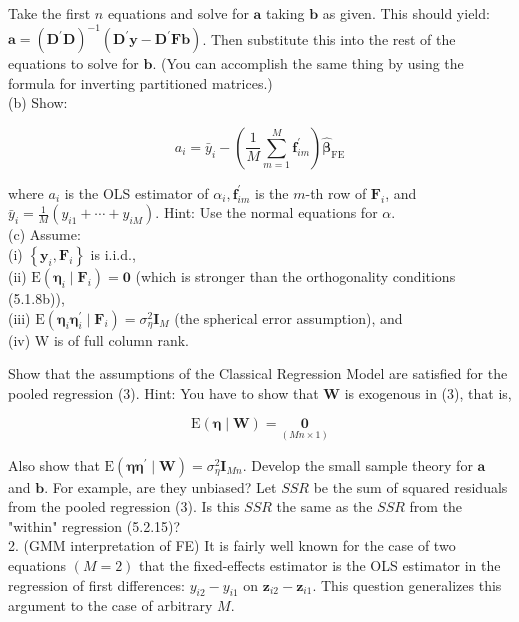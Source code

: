 \documentclass[10pt]{article}
\begin{document}
Take the first $n$ equations and solve for $\mathbf{a}$ taking $\mathbf{b}$ as given. This should yield: $\mathbf{a}=\left(\mathbf{D}^{\prime} \mathbf{D}\right)^{-1}\left(\mathbf{D}^{\prime} \mathbf{y}-\mathbf{D}^{\prime} \mathbf{F b}\right)$. Then substitute this into the rest of the equations to solve for $\mathbf{b}$. (You can accomplish the same thing by using the formula for inverting partitioned matrices.)\\
(b) Show:

$$
a_{i}=\bar{y}_{i}-\left(\frac{1}{M} \sum_{m=1}^{M} \mathbf{f}_{i m}^{\prime}\right) \widehat{\boldsymbol{\beta}}_{\mathrm{FE}}
$$

where $a_{i}$ is the OLS estimator of $\alpha_{i}, \mathbf{f}_{i m}^{\prime}$ is the $m$-th row of $\mathbf{F}_{i}$, and $\bar{y}_{i}= \frac{1}{M}\left(y_{i 1}+\cdots+y_{i M}\right)$. Hint: Use the normal equations for $\alpha$.\\
(c) Assume:\\
(i) $\left\{\mathbf{y}_{i}, \mathbf{F}_{i}\right\}$ is i.i.d.,\\
(ii) $\mathrm{E}\left(\boldsymbol{\eta}_{i} \mid \mathbf{F}_{i}\right)=\mathbf{0}$ (which is stronger than the orthogonality conditions (5.1.8b)),\\
(iii) $\mathrm{E}\left(\boldsymbol{\eta}_{i} \boldsymbol{\eta}_{i}^{\prime} \mid \mathbf{F}_{i}\right)=\sigma_{\eta}^{2} \mathbf{I}_{M}$ (the spherical error assumption), and\\
(iv) W is of full column rank.

Show that the assumptions of the Classical Regression Model are satisfied for the pooled regression (3). Hint: You have to show that $\mathbf{W}$ is exogenous in (3), that is,

$$
\mathrm{E}(\boldsymbol{\eta} \mid \mathbf{W})=\underset{(M n \times 1)}{\mathbf{0}}
$$

Also show that $\mathrm{E}\left(\boldsymbol{\eta} \boldsymbol{\eta}^{\prime} \mid \mathbf{W}\right)=\sigma_{\eta}^{2} \mathbf{I}_{M n}$. Develop the small sample theory for $\mathbf{a}$ and $\mathbf{b}$. For example, are they unbiased? Let $S S R$ be the sum of squared residuals from the pooled regression (3). Is this $S S R$ the same as the $S S R$ from the "within" regression (5.2.15)?\\
2. (GMM interpretation of FE) It is fairly well known for the case of two equations $(M=2)$ that the fixed-effects estimator is the OLS estimator in the regression of first differences: $y_{i 2}-y_{i 1}$ on $\mathbf{z}_{i 2}-\mathbf{z}_{i 1}$. This question generalizes this argument to the case of arbitrary $M$.
\end{document}
